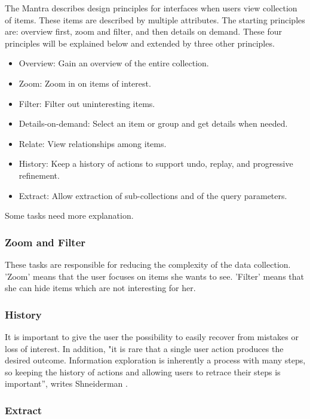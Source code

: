 \documentclass[11pt]{report}
\begin{document}
The Mantra describes design principles for interfaces when users view collection of items. These items are described by multiple attributes. The starting principles are: overview first, zoom and filter, and then details on demand. These four principles will be explained below and extended by three other principles.
\begin{itemize}
	\item Overview: Gain an overview of the entire collection.
	\item Zoom: Zoom in on items of interest.
	\item Filter: Filter out uninteresting items.
	\item Details-on-demand: Select an item or group and get details when needed.
	\item Relate: View relationships among items.
	\item History: Keep a history of actions to support undo, replay, and progressive refinement.
	\item Extract: Allow extraction of sub-collections and of the query parameters.
\end{itemize}

Some tasks need more explanation.

\subsubsection{Zoom and Filter}

These tasks are responsible for reducing the complexity of the data collection. 'Zoom' means that the user focuses on items she wants to see. 'Filter' means that she can hide items which are not interesting for her.

\subsubsection{History}

It is important to give the user the possibility to easily recover from mistakes or loss of interest. In addition, "it is rare that a single user action produces the desired outcome. Information exploration is inherently a process with many steps, so keeping the history of actions and allowing users to retrace their steps is important”, writes Shneiderman \cite{Shneiderman1996}.

\subsubsection{Extract}
\end{document}

